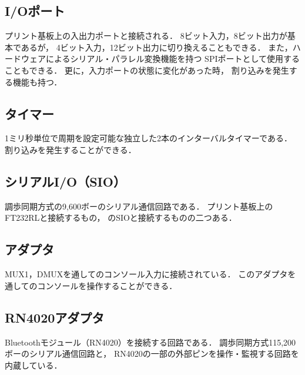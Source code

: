 \subsection{I/Oポート}
プリント基板上の入出力ポートと接続される．
8ビット入力，8ビット出力が基本であるが，
4ビット入力，12ビット出力に切り換えることもできる．
また，ハードウェアによるシリアル・パラレル変換機能を持つ
SPIポートとして使用することもできる．
更に，入力ポートの状態に変化があった時，
割り込みを発生する機能も持つ．

\subsection{タイマー}
1ミリ秒単位で周期を設定可能な独立した2本のインターバルタイマーである．
割り込みを発生することができる．

\subsection{シリアルI/O（SIO）}
調歩同期方式の9,600ボーのシリアル通信回路である．
プリント基板上のFT232RLと接続するもの，
{\tec}のSIOと接続するものの二つある．

\subsection{{\tec}アダプタ}
MUX1，DMUXを通して{\tec}のコンソール入力に接続されている．
このアダプタを通して{\tec}のコンソールを操作することができる．

\subsection{RN4020アダプタ}
Bluetoothモジュール（RN4020）を接続する回路である．
調歩同期方式115,200ボーのシリアル通信回路と，
RN4020の一部の外部ピンを操作・監視する回路を内蔵している．
